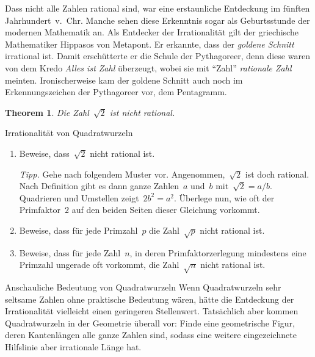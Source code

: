 \documentclass[twoside]{../zirkelblatt1415}
\theoremstyle{definition}
\theoremstyle{plain}
\newtheorem{thm}[defn]{Theorem}
\theoremstyle{remark}
\begin{document}
Dass nicht alle Zahlen rational sind, war eine erstaunliche Entdeckung im
fünften Jahrhundert~v.~Chr. Manche sehen diese Erkenntnis sogar als
Geburtsstunde der modernen Mathematik an. Als Entdecker der
Irrationalität gilt der griechische Mathematiker Hippasos von Metapont. Er
erkannte, dass der \emph{goldene Schnitt} irrational ist. Damit erschütterte er
die Schule der Pythagoreer, denn diese waren von dem Kredo \emph{Alles ist
Zahl} überzeugt, wobei sie mit "`Zahl"' \emph{rationale Zahl} meinten.
Ironischerweise kam der goldene Schnitt auch noch im Erkennungszeichen der
Pythagoreer vor, dem Pentagramm.

\begin{thm}Die Zahl~$\sqrt{2}$ ist nicht rational.\end{thm}

\begin{aufgabe}{Irrationalität von Quadratwurzeln}
\begin{enumerate}
\item Beweise, dass~$\sqrt{2}$ nicht rational ist.

\emph{Tipp.} Gehe nach folgendem Muster vor. Angenommen,~$\sqrt{2}$ ist doch
rational. Nach Definition gibt es dann ganze Zahlen~$a$ und~$b$ mit~$\sqrt{2} =
a/b$. Quadrieren und Umstellen zeigt~$2 b^2 = a^2$. Überlege nun, wie oft der
Primfaktor~$2$ auf den beiden Seiten dieser Gleichung vorkommt.

\item Beweise, dass für jede Primzahl~$p$ die Zahl~$\sqrt{p}$ nicht rational
ist.

\item Beweise, dass für jede Zahl~$n$, in deren Primfaktorzerlegung mindestens
eine Primzahl ungerade oft vorkommt, die Zahl~$\sqrt{n}$ nicht rational ist.
\end{enumerate}\fixlistspacing
\end{aufgabe}

\begin{aufgabe}{Anschauliche Bedeutung von Quadratwurzeln}
Wenn Quadratwurzeln sehr seltsame Zahlen ohne praktische Bedeutung wären,
hätte die Entdeckung der Irrationalität vielleicht einen geringeren
Stellenwert. Tatsächlich aber kommen Quadratwurzeln in der
Geometrie überall vor: Finde eine geometrische Figur, deren Kantenlängen alle
ganze Zahlen sind, sodass eine weitere eingezeichnete Hilfslinie aber
irrationale Länge hat.
\end{aufgabe}
\end{document}
